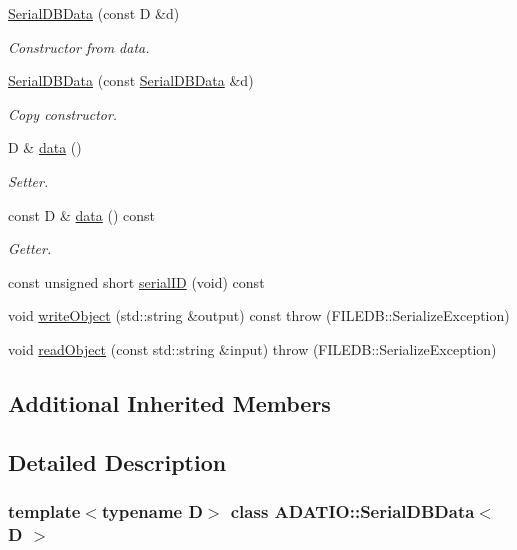 \begin{DoxyCompactItemize}
\mbox{\hyperlink{classADATIO_1_1SerialDBData_afe5b91aca4221cfce681c85498a46f0c}{Serial\+D\+B\+Data}} (const D \&d)
\begin{DoxyCompactList}\small\item\em Constructor from data. \end{DoxyCompactList}\item 
\mbox{\hyperlink{classADATIO_1_1SerialDBData_a740c06f0022817ca9c071d186d7b3e92}{Serial\+D\+B\+Data}} (const \mbox{\hyperlink{classADATIO_1_1SerialDBData}{Serial\+D\+B\+Data}} \&d)
\begin{DoxyCompactList}\small\item\em Copy constructor. \end{DoxyCompactList}\item 
D \& \mbox{\hyperlink{classADATIO_1_1SerialDBData_af4a3864baddbecbc6177f164f8a1f664}{data}} ()
\begin{DoxyCompactList}\small\item\em Setter. \end{DoxyCompactList}\item 
const D \& \mbox{\hyperlink{classADATIO_1_1SerialDBData_a5532be95ec6214348c087afd8b2ff683}{data}} () const
\begin{DoxyCompactList}\small\item\em Getter. \end{DoxyCompactList}\item 
const unsigned short \mbox{\hyperlink{classADATIO_1_1SerialDBData_a513643be38434a570d655602330aade9}{serial\+ID}} (void) const
\item 
void \mbox{\hyperlink{classADATIO_1_1SerialDBData_a5266e4f1c065f0776f9974d6fad51a2f}{write\+Object}} (std\+::string \&output) const  throw (\+F\+I\+L\+E\+D\+B\+::\+Serialize\+Exception)
\item 
void \mbox{\hyperlink{classADATIO_1_1SerialDBData_a2f7405b96f413b1787fc2072b8932c20}{read\+Object}} (const std\+::string \&input)  throw (\+F\+I\+L\+E\+D\+B\+::\+Serialize\+Exception)
\end{DoxyCompactItemize}
\subsection*{Additional Inherited Members}


\subsection{Detailed Description}
\subsubsection*{template$<$typename D$>$\newline
class A\+D\+A\+T\+I\+O\+::\+Serial\+D\+B\+Data$<$ D $>$}

